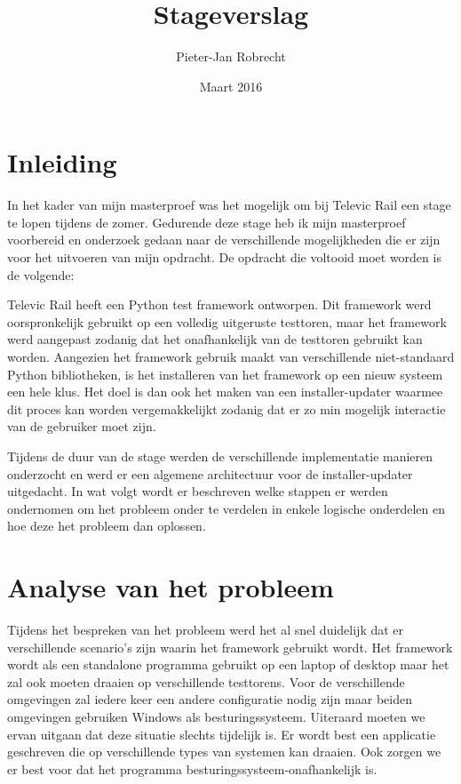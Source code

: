 \documentclass{article}
\title{Stageverslag}
\author{\mbox{Pieter-Jan} Robrecht}
\date{Maart 2016}
\begin{document}


\clearpage
\setcounter{page}{1}

\tableofcontents

\section{Inleiding}
In het kader van mijn masterproef was het mogelijk om bij Televic Rail een stage te lopen tijdens de zomer. 
Gedurende deze stage heb ik mijn masterproef voorbereid en onderzoek gedaan naar de verschillende mogelijkheden die er zijn voor het uitvoeren van mijn opdracht.
De opdracht die voltooid moet worden is de volgende:

\begin{displayquote}
Televic Rail heeft een Python test framework ontworpen. 
Dit framework werd oorspronkelijk gebruikt op een volledig uitgeruste testtoren, maar het framework werd aangepast zodanig dat het onafhankelijk van de testtoren gebruikt kan worden.
Aangezien het framework gebruik maakt van verschillende niet-standaard Python bibliotheken, is het installeren van het framework op een nieuw systeem een hele klus.
Het doel is dan ook het maken van een installer-updater waarmee dit proces kan worden vergemakkelijkt zodanig dat er zo min mogelijk interactie van de gebruiker moet zijn.
\end{displayquote}

Tijdens de duur van de stage werden de verschillende implementatie manieren onderzocht en werd er een algemene architectuur voor de installer-updater uitgedacht.
In wat volgt wordt er beschreven welke stappen er werden ondernomen om het probleem onder te verdelen in enkele logische onderdelen en hoe deze het probleem dan oplossen. 

\section{Analyse van het probleem} \label{section:analyse}
Tijdens het bespreken van het probleem werd het al snel duidelijk dat er verschillende scenario's zijn waarin het framework gebruikt wordt. 
Het framework wordt als een standalone programma gebruikt op een laptop of desktop maar het zal ook moeten draaien op verschillende testtorens. 
Voor de verschillende omgevingen zal iedere keer een andere configuratie nodig zijn maar beiden omgevingen gebruiken Windows als besturingssysteem.
Uiteraard moeten we ervan uitgaan dat deze situatie slechts tijdelijk is.
Er wordt best een applicatie geschreven die op verschillende types van systemen kan draaien.
Ook zorgen we er best voor dat het programma besturingssysteem-onafhankelijk is.
\end{document}

